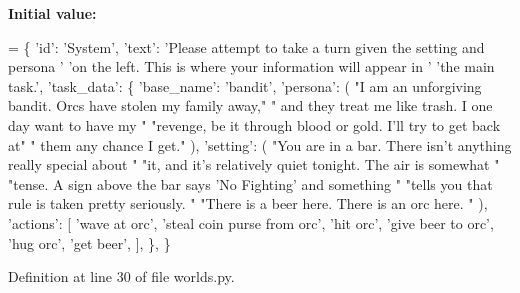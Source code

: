{\bfseries Initial value\+:}
\begin{DoxyCode}
=  \{
        \textcolor{stringliteral}{'id'}: \textcolor{stringliteral}{'System'},
        \textcolor{stringliteral}{'text'}: \textcolor{stringliteral}{'Please attempt to take a turn given the setting and persona '}
        \textcolor{stringliteral}{'on the left. This is where your information will appear in '}
        \textcolor{stringliteral}{'the main task.'},
        \textcolor{stringliteral}{'task\_data'}: \{
            \textcolor{stringliteral}{'base\_name'}: \textcolor{stringliteral}{'bandit'},
            \textcolor{stringliteral}{'persona'}: (
                \textcolor{stringliteral}{"I am an unforgiving bandit. Orcs have stolen my family away,"}
                \textcolor{stringliteral}{" and they treat me like trash. I one day want to have my "}
                \textcolor{stringliteral}{"revenge, be it through blood or gold. I'll try to get back at"}
                \textcolor{stringliteral}{" them any chance I get."}
            ),
            \textcolor{stringliteral}{'setting'}: (
                \textcolor{stringliteral}{"You are in a bar. There isn't anything really special about "}
                \textcolor{stringliteral}{"it, and it's relatively quiet tonight. The air is somewhat "}
                \textcolor{stringliteral}{"tense. A sign above the bar says 'No Fighting' and something "}
                \textcolor{stringliteral}{"tells you that rule is taken pretty seriously. "}
                \textcolor{stringliteral}{"There is a beer here. There is an orc here. "}
            ),
            \textcolor{stringliteral}{'actions'}: [
                \textcolor{stringliteral}{'wave at orc'},
                \textcolor{stringliteral}{'steal coin purse from orc'},
                \textcolor{stringliteral}{'hit orc'},
                \textcolor{stringliteral}{'give beer to orc'},
                \textcolor{stringliteral}{'hug orc'},
                \textcolor{stringliteral}{'get beer'},
            ],
        \},
    \}
\end{DoxyCode}


Definition at line 30 of file worlds.\+py.

\mbox{\label{classlight__chats_1_1worlds_1_1LightChatOnboardingWorld_a5b2b58ba5374d0ef950bd3c0298085c7}} 
